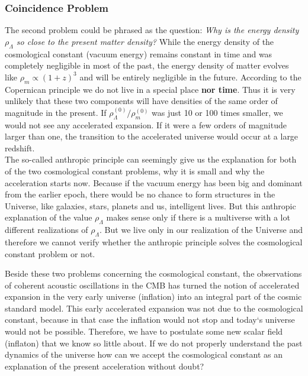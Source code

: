 \subsubsection{Coincidence Problem}
The second problem  could be phrased as the question: \textit{Why is the energy density $\rho_\Lambda$ so close to the present matter density?} While the energy density of the cosmological constant (vacuum energy) remains constant in time and was completely negligible in most of the past, the energy density of matter evolves like $\rho_m\propto(1+z)^3$ and will be entirely negligible in the future. According to the Copernican principle \parencite{ellis_maartens_maccallum_2012} we do not live in a special place \textbf{nor time}. Thus it is very unlikely that these two components will have densities of the same order of magnitude in the present. If $\rho^{(0)}_\Lambda/\rho^{(0)}_m$ was just 10 or 100 times smaller, we would not see any accelerated expansion. If it were a few orders of magnitude larger than one, the transition to the accelerated universe would occur at a large redshift.
\\

The so-called anthropic principle can seemingly give us the explanation for both of the two cosmological constant problems, why it is small and why the acceleration starts now. Because if the vacuum energy has been big and dominant from the earlier epoch, there would be no chance to form structures in the Universe, like galaxies, stars, planets and us, intelligent lives. But this anthropic explanation of the value $\rho_\Lambda$ makes sense only if there is a multiverse with a lot different realizations of $\rho_\Lambda$. But we live only in our realization of the Universe and therefore we cannot verify whether the anthropic principle solves the cosmological constant problem or not.

Beside these two problems concerning the cosmological constant, the observations of coherent acoustic oscillations in the CMB \parencite{planck_cosm} has turned the notion of accelerated expansion in the very early universe (inflation) into an integral part of the cosmic standard model. This early accelerated expansion was not due to the cosmological constant, because in that case the inflation would not stop and today`s universe would not be possible. Therefore, we have to postulate some new scalar field (inflaton) \parencite{2015IJMPD..2430010C} that we know so little about. If we do not properly understand the past dynamics of the universe how can we accept the cosmological constant as an explanation of the present acceleration without doubt?